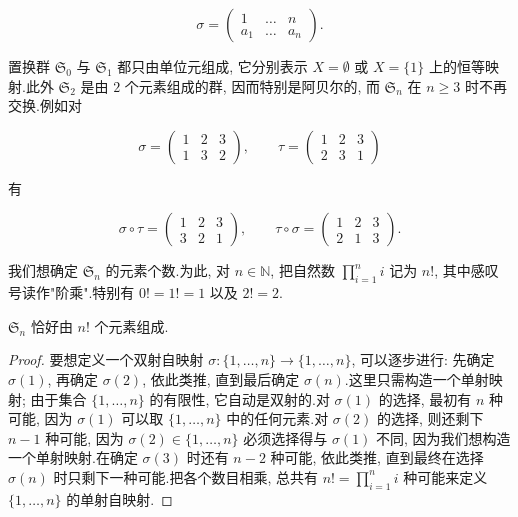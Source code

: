 \[
\sigma = \begin{pmatrix} 1 & \ldots & n \\ a_1 & \ldots & a_n \end{pmatrix}.
\]

置换群 $\mathfrak{S}_0$ 与 $\mathfrak{S}_1$ 都只由单位元组成, 它分别表示 $X = \emptyset$ 或 $X = \{1\}$ 上的恒等映射.此外 $\mathfrak{S}_2$ 是由 $2$ 个元素组成的群, 因而特别是阿贝尔的, 而 $\mathfrak{S}_n$ 在 $n \geq 3$ 时不再交换.例如对

\[
\sigma = \begin{pmatrix} 1 & 2 & 3 \\ 1 & 3 & 2 \end{pmatrix}, \qquad \tau = \begin{pmatrix} 1 & 2 & 3 \\ 2 & 3 & 1 \end{pmatrix}
\]

有

\[
\sigma \circ \tau = \begin{pmatrix} 1 & 2 & 3 \\ 3 & 2 & 1 \end{pmatrix}, \qquad \tau \circ \sigma = \begin{pmatrix} 1 & 2 & 3 \\ 2 & 1 & 3 \end{pmatrix}.
\]

我们想确定 $\mathfrak{S}_n$ 的元素个数.为此, 对 $n \in \mathbb{N}$, 把自然数 $\prod_{i = 1}^{n} i$ 记为 $n!$, 其中感叹号读作"阶乘".特别有 $0! = 1! = 1$ 以及 $2! = 2$.

\begin{remark}[$\mathfrak{S}_n$ 的阶]\label{rem:4.1.1}
$\mathfrak{S}_n$ 恰好由 $n!$ 个元素组成.
\end{remark}

\begin{proof}
要想定义一个双射自映射 $\sigma \colon \{1, \ldots, n\} \longrightarrow \{1, \ldots, n\}$, 可以逐步进行: 先确定 $\sigma(1)$, 再确定 $\sigma(2)$, 依此类推, 直到最后确定 $\sigma(n)$.这里只需构造一个单射映射; 由于集合 $\{1, \ldots, n\}$ 的有限性, 它自动是双射的.对 $\sigma(1)$ 的选择, 最初有 $n$ 种可能, 因为 $\sigma(1)$ 可以取 $\{1, \ldots, n\}$ 中的任何元素.对 $\sigma(2)$ 的选择, 则还剩下 $n - 1$ 种可能, 因为 $\sigma(2) \in \{1, \ldots, n\}$ 必须选择得与 $\sigma(1)$ 不同, 因为我们想构造一个单射映射.在确定 $\sigma(3)$ 时还有 $n - 2$ 种可能, 依此类推, 直到最终在选择 $\sigma(n)$ 时只剩下一种可能.把各个数目相乘, 总共有 $n! = \prod_{i = 1}^{n} i$ 种可能来定义 $\{1, \ldots, n\}$ 的单射自映射.
\end{proof}

